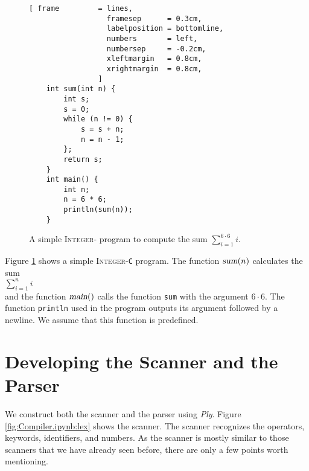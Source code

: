 \begin{figure}[!ht]
\centering
\begin{Verbatim}[ frame         = lines, 
                  framesep      = 0.3cm, 
                  labelposition = bottomline,
                  numbers       = left,
                  numbersep     = -0.2cm,
                  xleftmargin   = 0.8cm,
                  xrightmargin  = 0.8cm,
                ]
    int sum(int n) {
        int s;
        s = 0;
        while (n != 0) {
            s = s + n;
            n = n - 1;    
        };
        return s;
    }  
    int main() {
        int n;
        n = 6 * 6;
        println(sum(n));
    }
\end{Verbatim}
\vspace*{-0.3cm}
\caption{A simple \textsc{Integer}- program to compute the sum
  $\displaystyle \sum\limits_{i=1}^{6 \cdot 6} i$.}
\label{fig:sum.c}
\end{figure}

\noindent
Figure \ref{fig:sum.c} shows a simple \textsc{Integer}-\texttt{C} program. The function $\textsl{sum}(n)$
calculates the sum 
\\[0.2cm]
\hspace*{1.3cm}
$\displaystyle\sum\limits_{i=1}^n i$
\\[0.2cm]
 and the function $\textsl{main}()$ calls the function \texttt{sum}
with the argument $6 \cdot 6$. The function \texttt{println} used in the program outputs its argument followed
by a newline. We assume that this function is predefined. 

\section{Developing the  Scanner and the Parser}
We construct both the scanner and the parser using  \textsl{Ply}.
Figure \ref{fig:Compiler.ipynb:lex} shows the scanner.  The scanner
recognizes the operators, keywords, identifiers, and numbers.  As the scanner is mostly similar to those
scanners that we have already seen before, there are only a few points worth mentioning.

